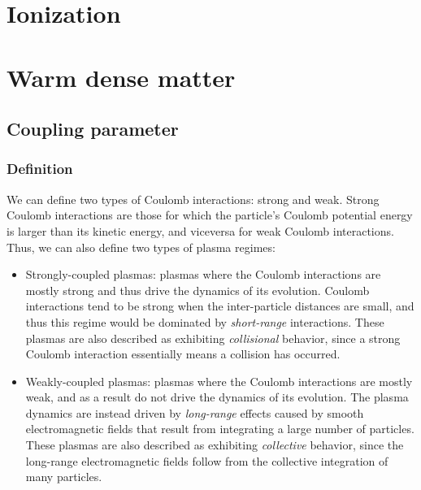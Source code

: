 \documentclass[a4paper,11pt]{report}
\begin{document}
\chapter{Ionization}

\chapter{Warm dense matter}
\section{Coupling parameter}
\subsection{Definition}
We can define two types of Coulomb interactions: strong and weak. Strong Coulomb interactions are those for which the particle's Coulomb potential energy is larger than its kinetic energy, and viceversa for weak Coulomb interactions. Thus, we can also define two types of plasma regimes:
\begin{itemize}
    \item Strongly-coupled plasmas: plasmas where the Coulomb interactions are mostly strong and thus drive the dynamics of its evolution. Coulomb interactions tend to be strong when the inter-particle distances are small, and thus this regime would be dominated by \textit{short-range} interactions. These plasmas are also described as exhibiting \textit{collisional} behavior, since a strong Coulomb interaction essentially means a collision has occurred.
    \item Weakly-coupled plasmas: plasmas where the Coulomb interactions are mostly weak, and as a result do not drive the dynamics of its evolution. The plasma dynamics are instead driven by \textit{long-range} effects caused by smooth electromagnetic fields that result from integrating a large number of particles. These plasmas are also described as exhibiting \textit{collective} behavior, since the long-range electromagnetic fields follow from the collective integration of many particles.
\end{itemize}
\end{document}
